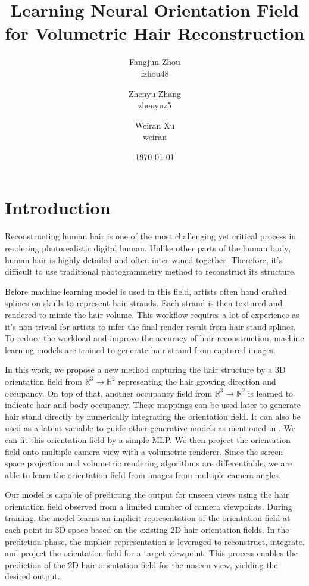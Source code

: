 \documentclass[12pt]{article}
\title{Learning Neural Orientation Field for Volumetric Hair Reconstruction}
\author{
    Fangjun Zhou \\ fzhou48
    \and Zhenyu Zhang \\ zhenyuz5
    \and Weiran Xu \\ weiran
}
\date{\today}
\begin{document}
\maketitle


\section{Introduction}

Reconstructing human hair is one of the most challenging yet critical process in rendering photorealistic digital human. Unlike other parts of the human body, human hair is highly detailed and often intertwined together. Therefore, it's difficult to use traditional photogrammetry method to reconstruct its structure.

Before machine learning model is used in this field, artists often hand crafted splines on skulls to represent hair strands. Each strand is then textured and rendered to mimic the hair volume. This workflow requires a lot of experience as it's non-trivial for artists to infer the final render result from hair stand splines. To reduce the workload and improve the accuracy of hair reconstruction, machine learning models are trained to generate hair strand from captured images.

In this work, we propose a new method capturing the hair structure by a 3D orientation field from $\mathbb{R}^{3} \rightarrow \mathbb{R}^{2}$ representing the hair growing direction and occupancy. On top of that, another occupancy field from $\mathbb{R}^{3} \rightarrow \mathbb{R}^{2}$ is learned to indicate hair and body occupancy. These mappings can be used later to generate hair stand directly by numerically integrating the orientation field. It can also be used as a latent variable to guide other generative models as mentioned in \cite{metzer_latent-nerf_2022}. We can fit this orientation field by a simple MLP. We then project the orientation field onto multiple camera view with a volumetric renderer. Since the screen space projection and volumetric rendering algorithms are differentiable, we are able to learn the orientation field from images from multiple camera angles.

Our model is capable of predicting the output for unseen views using the hair orientation field observed from a limited number of camera viewpoints. During training, the model learns an implicit representation of the orientation field at each point in 3D space based on the existing 2D hair orientation fields. In the prediction phase, the implicit representation is leveraged to reconstruct, integrate, and project the orientation field for a target viewpoint. This process enables the prediction of the 2D hair orientation field for the unseen view, yielding the desired output.
\end{document}
